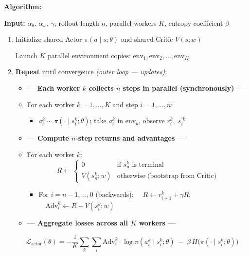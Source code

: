 \documentclass[11pt]{article}
\providecommand{\tightlist}{%
      \setlength{\itemsep}{0pt}\setlength{\parskip}{0pt}}
\begin{document}
    \textbf{Algorithm:}

\textbf{Input:} \(\alpha_\theta\), \(\alpha_w\), \(\gamma\), rollout
length \(n\), parallel workers \(K\), entropy coefficient \(\beta\)

\begin{enumerate}
\def\labelenumi{\arabic{enumi}.}
\item
  Initialize shared Actor \(\pi(a \mid s;\theta)\) and shared Critic
  \(V(s;w)\)

  Launch \(K\) parallel environment copies:
  \(\text{env}_1, \text{env}_2, \ldots, \text{env}_K\)
\item
  \textbf{Repeat} until convergence \emph{(outer loop --- updates)}:

  \begin{itemize}
  \item
    \textbf{--- Each worker \(k\) collects \(n\) steps in parallel
    (synchronously) ---}
  \item
    For each worker \(k = 1, \ldots, K\) and step \(i = 1, \ldots, n\):

    \begin{itemize}
    \tightlist
    \item
      \(a_i^k \sim \pi(\cdot \mid s_i^k;\theta)\); take \(a_i^k\) in
      \(\text{env}_k\), observe \(r_i^k,\; s_i^{\prime k}\)
    \end{itemize}
  \item
    \textbf{--- Compute \(n\)-step returns and advantages ---}
  \item
    For each worker \(k\):
    \[R \leftarrow \begin{cases} 0 & \text{if } s_n^k \text{ is terminal} \\ V(s_n^k;w) & \text{otherwise (bootstrap from Critic)} \end{cases}\]

    \begin{itemize}
    \tightlist
    \item
      For \(i = n{-}1, \ldots, 0\) (backwards):
      \(\quad R \leftarrow r_{i+1}^k + \gamma R\);
      \(\quad \mathrm{Adv}_i^k \leftarrow R - V(s_i^k;w)\)
    \end{itemize}
  \item
    \textbf{--- Aggregate losses across all \(K\) workers ---}
  \end{itemize}

  \[\mathcal{L}_\text{actor}(\theta) = -\frac{1}{K}\sum_k\sum_i \mathrm{Adv}_i^k \cdot \log\pi(a_i^k \mid s_i^k;\theta) \;-\; \beta\, H\!\bigl(\pi(\cdot \mid s_i^k;\theta)\bigr)\]


\end{enumerate}
\end{document}
